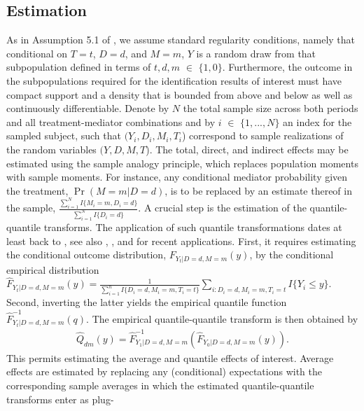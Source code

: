 \documentclass[a4paper,12pt]{article}
\begin{document}
 \doublespacing \pagestyle{plain}
\subsection{Estimation}
 As in Assumption 5.1 of , we assume standard regularity conditions, namely that conditional on $T=t$, $D=d$, and $M=m$, $Y$ is a random draw from that subpopulation defined in terms of $t,d,m$ $\in$ $\{1,0\}$. Furthermore, the outcome in the subpopulations required for the identification results of interest must have compact support and a density that is bounded from above and below as well as continuously differentiable. Denote by $N$ the total sample size across both periods and all treatment-mediator combinations and by $i$ $\in$ $\{1,...,N\}$ an index for the sampled subject, such that $(Y_i,D_i,M_i,T_i$) correspond to sample realizations of the random variables $(Y,D,M,T$).
 The total, direct, and indirect effects may be estimated using the sample analogy principle, which replaces population moments with sample moments. For instance, any conditional mediator probability given the treatment, $\Pr(M=m|D=d)$, is to be replaced by an estimate thereof in the sample, $ \frac{\sum_{i=1}^{N} I\{M_i=m,D_i=d\}}{\sum_{i=1}^{N} I\{D_i=d\}}$. A crucial step is the estimation of the quantile-quantile transforms. The application of such quantile transformations dates at least back to , see also , , and  for recent applications. First, it requires estimating the conditional outcome distribution, $F_{Y_t|D=d,M=m}(y)$, by the conditional empirical distribution $\hat{F}_{Y_t|D=d,M=m}(y)=\frac{1}{\sum_{i=1}^{n}I\{D_i=d, M_i=m, T_i=t\}}\sum_{i:D_i=d,M_i=m,T_i=t}I\{Y_i\leq y\}$. Second, inverting the latter yields the empirical quantile function $\hat{F}_{Y_t|D=d,M=m}^{-1}(q)$. The empirical quantile-quantile transform is then obtained by
  \begin{eqnarray*}
 \hat{Q}_{dm}(y) = \hat{F}_{Y_{1}|D=d,M=m}^{-1}(\hat{F}_{Y_{0}|D=d,M=m}(y)).
  \end{eqnarray*}
 This permits estimating the average and quantile effects of interest. Average effects are estimated by replacing any (conditional) expectations with the corresponding sample averages in which the estimated quantile-quantile transforms enter as plug-
\end{document}
